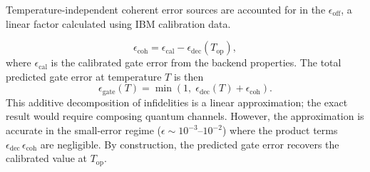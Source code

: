 \documentclass[showpacs,amsmath,amssymb,twocolumn,superscriptaddress,notitlepage,preprintnumbers,pra]{revtex4-1}
\begin{document}
Temperature-independent coherent error sources are accounted for in the $\epsilon_\mathrm{off}$, a linear factor calculated using IBM calibration data.

\begin{equation}
	\label{eq:coherent_floor}
	\epsilon_\mathrm{coh} = \epsilon_\mathrm{cal} - \epsilon_\mathrm{dec}(T_\mathrm{op}),
\end{equation}
where $\epsilon_\mathrm{cal}$ is the calibrated gate error from the backend properties. The total predicted gate error at temperature $T$ is then
\begin{equation}
	\label{eq:gate_error_total}
	\epsilon_\mathrm{gate}(T) = \min\!\left(1,\; \epsilon_\mathrm{dec}(T) + \epsilon_\mathrm{coh}\right).
\end{equation}
This additive decomposition of infidelities is a linear approximation; the exact result would require composing quantum channels. However, the approximation is accurate in the small-error regime ($\epsilon \sim 10^{-3}$--$10^{-2}$) where the product terms $\epsilon_\mathrm{dec}\,\epsilon_\mathrm{coh}$ are negligible. By construction, the predicted gate error recovers the calibrated value at $T_\mathrm{op}$.


\end{document}
